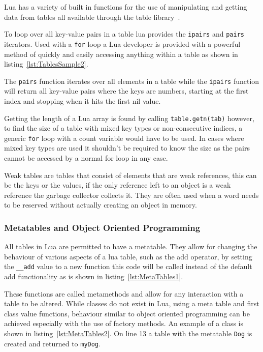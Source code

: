 \documentclass[11pt,a4paper,titlepage]{article}
\begin{document}
			Lua has a variety of built in functions for the use of manipulating and getting data from tables all available through the table library~\cite{LuaMan}.

			To loop over all key-value pairs in a table lua provides the \texttt{ipairs} and \texttt{pairs} iterators. Used with a \texttt{for} loop a Lua developer is provided with a powerful method of quickly and easily accessing anything within a table as shown in listing~\ref{lst:TablesSample2}.
			

			The \texttt{pairs} function iterates over all elements in a table while the \texttt{ipairs} function will return all key-value pairs where the keys are numbers, starting at the first index and stopping when it hits the first nil value.~\cite{Ierusalimschy:2013:PLT:2502646} 
			
			Getting the length of a Lua array is found by calling \texttt{table.getn(tab)} however, to find the size of a table with mixed key types or non-consecutive indices, a generic \texttt{for} loop with a count variable would have to be used. In cases where mixed key types are used it shouldn't be required to know the size as the pairs cannot be accessed by a normal for loop in any case.

			Weak tables are tables that consist of elements that are weak references, this can be the keys or the values, if the only reference left to an object is a weak reference the garbage collector collects it. They are often used when a word needs to be reserved without actually creating an object in memory.
			
		\subsubsection{Metatables and Object Oriented Programming}
			All tables in Lua are permitted to have a metatable\cite{Ierusalimschy:2013:PLT:2502646}. They allow for changing the behaviour of various aspects of a lua table, such as the add operator, by setting the \texttt{\_\_add} value to a new function this code will be called instead of the default add functionality as is shown in listing~\ref{lst:MetaTables1}.
			

			These functions are called metamethods and allow for any interaction with a table to be altered. While classes do not exist in Lua, using a meta table and first class value functions, behaviour similar to object oriented programming can be achieved especially with the use of factory methods. An example of a class is shown in listing~\ref{lst:MetaTables2}. On line 13 a table with the metatable \texttt{Dog} is created and returned to \texttt{myDog}.
			
\end{document}
